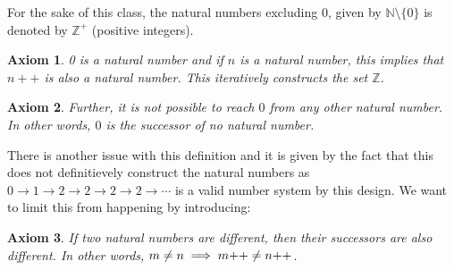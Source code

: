 \documentclass[14pt]{extarticle}
\newtheorem{axiom}{Axiom}[section]
\begin{document}
For the sake of this class, the natural numbers excluding $0$, given by $\mathbb{N}\setminus \{0\}$
is denoted by $\mathbb{Z}^\plus$ (positive integers).

\begin{axiom}
    0 is a natural number and if $n$ is a natural number, this implies that $n++$ is also a natural number.
    This iteratively constructs the set $\mathbb{Z}$. 
\end{axiom}

\begin{axiom}
    Further, it is not possible to reach $0$ from any other natural number. In other words, 
    $0$ is the successor of no natural number.
\end{axiom}

There is another issue with this definition and it is given by the fact that this does not 
definitievely construct the natural numbers as $0 \to 1 \to 2 \to 2 \to 2 \to 2 \to \cdots$
is a valid number system by this design. We want to limit this from happening by introducing:

\begin{axiom}
    If two natural numbers are different, then their successors are also different. In other words,
    $m \neq n \implies m\tiny{++} \neq n\tiny{++}$.
\end{axiom}

\vspace{1cm}
\end{document}
